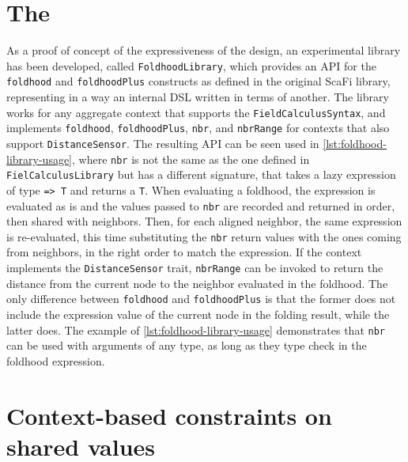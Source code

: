 \section{The } \label{chap:implementation->sec:foldhood-library}

As a proof of concept of the expressiveness of the \this design, an experimental library has been developed, called \texttt{FoldhoodLibrary}, which provides an \ac{API} for the \texttt{foldhood} and \texttt{foldhoodPlus} constructs as defined in the original ScaFi library, representing in a way an internal \ac{DSL} written in terms of another.
%
The library works for any aggregate context that supports the \texttt{FieldCalculusSyntax}, and implements \texttt{foldhood}, \texttt{foldhoodPlus}, \texttt{nbr}, and \texttt{nbrRange} for contexts that also support \texttt{DistanceSensor}.
%
The resulting \ac{API} can be seen used in \cref{lst:foldhood-library-usage},
where \texttt{nbr} is not the same as the one defined in \texttt{FielCalculusLibrary} but has a different signature, that takes a lazy expression of type \texttt{=> T} and returns a \texttt{T}.
%
When evaluating a foldhood, the expression is evaluated as is and the values passed to \texttt{nbr} are recorded and returned in order, then shared with neighbors.
%
Then, for each aligned neighbor, the same expression is re-evaluated, this time substituting the \texttt{nbr} return values with the ones coming from neighbors, in the right order to match the expression.
%
If the context implements the \texttt{DistanceSensor} trait, \texttt{nbrRange} can be invoked to return the distance from the current node to the neighbor evaluated in the foldhood.
%
The only difference between \texttt{foldhood} and \texttt{foldhoodPlus} is that the former does not include the expression value of the current node in the folding result, while the latter does.
%
The example of \cref{lst:foldhood-library-usage} demonstrates that \texttt{nbr} can be used with arguments of any type, as long as they type check in the foldhood expression.




\section{Context-based constraints on shared values} \label{chap:implementation->sec:context-based-constraints}

